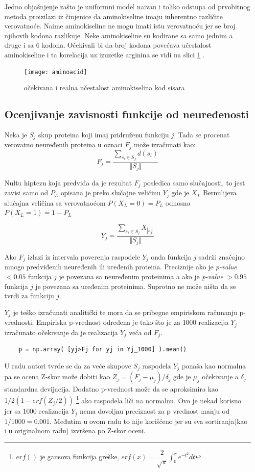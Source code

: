 Jedno objašnjenje zašto je uniformni model naivan i toliko odstupa od
prvobitnog metoda proizilazi iz činjenice da aminokiseline imaju inherentno
različite verovatnoće. Naime  aminokiseline ne mogu  imati istu
verovatnoću jer se  broj njihovih kodona razlikuje. Neke aminokiseline
su kodirane sa samo jednim a druge i sa 6 kodona. Očekivali bi da broj kodona
povećava učestalost aminokiseline i ta korelacija uz izuzetke arginina se vidi
na slici
\ref{fig:aminoacid} \parencite{AKfrekvencija}.

\begin{figure}[th]
\centering
\texttt{[image: aminoacid]}
\decoRule
\caption{očekivana i realna učestalost  aminokiselina kod sisara}
\label{fig:aminoacid}
\end{figure}



\subsection{Ocenjivanje zavisnosti funkcije od neuređenosti}

Neka je $S_j$ skup proteina koji imaj pridruženu funkciju $j$. Tada se procenat
verovatno neuređenih proteina u oznaci $F_j$ može izračunati kao: $$F_j =
\dfrac{\sum_{s_i \in S_j} d(s_i)} {\Vert S_j \Vert} $$

Nultu hiptezu koja predviđa da je rezultat $F_j$ posledica samo slučajnosti, to
jest zavisi samo od $P_L$ opisana je preko slučajne veličinu $Y_j$
gde je $X_L$ Bernulijeva slučajna veličina sa verovatnoćom $P(X_L = 0) = P_L$
odnosno $P(X_L = 1) = 1-P_L$

$$ Y_j = \dfrac {\sum_{s_i \in S_j} {X_{|s_j|}}}{\Vert S_j \Vert}$$

Ako $F_j$ izlazi iz intervala poverenja raspodele $Y_j$ onda funkcija $j$
sadrži značajno mnogo predviđenih neuređenih ili uređenih proteina. Preciznije
ako je \textit{p-value} $<0.05$ funkcija $j$ je povezana sa neuređenim
proteinima a ako je \textit{p-value} $>0.95$ funkcija $j$ je povezana sa
uređenim proteinima. Suprotno ne može ništa da se tvrdi za funkciju $j$.

$Y_j$ je teško izračunati analitički te mora da se pribegne empiriskom
računanju p-vrednosti. Empiriska p-vrednost određena je tako što je za 1000
realizacija $Y_j$ izračunato očekivanje da je realizacija $Y_j$ veća od $F_j$.
\begin{verbatim}
    p = np.array( [yj>Fj for yj in Yj_1000] ).mean()
\end{verbatim}
U radu \parencite{Xie2007} autori tvrde se da za veće skupove $S_j$ raspodela
$Y_j$ ponaša kao normalna pa se ocena Z-skor može dobiti kao
$Z_j=(F_j-\mu_j)/\delta_j$ gde je $\mu_j$ očekivanje a $\delta_j$ standardna
devijacija.  Dodatno p-vrednost može da se aproksimira kao $1/2(1-erf(Z_j/2))$
\footnote{$erf()$ je gausova funkcija greške,
$erf(x)=\dfrac{2}{\sqrt{\pi}} \int_{0}^{x}  e^{-t^2} dt$ }
ako raspodela liči na normalnu. Ovo je nekad korisno jer sa 1000 realizacija
$Y_j$ nema dovoljnu preciznost za p vrednost manju od $1/1000=0.001$. Međutim u
ovom radu to nije korišćeno jer su sva sortiranja(kao i u originalnom radu)
izvršena po Z-skor oceni.


